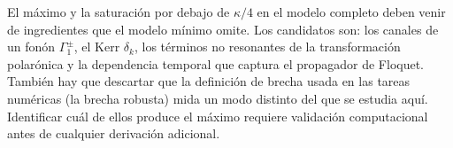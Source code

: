 \documentclass[11pt]{report}
\begin{document}
El m\'aximo y la saturaci\'on por debajo de $\kappa/4$ en el modelo completo deben venir de ingredientes que el modelo m\'inimo omite. Los candidatos son: los canales de un fon\'on $\Gamma_{1}^{\pm}$, el Kerr $\delta_{k}$, los t\'erminos no resonantes de la transformaci\'on polar\'onica y la dependencia temporal que captura el propagador de Floquet. Tambi\'en hay que descartar que la definici\'on de brecha usada en las tareas num\'ericas (la brecha robusta) mida un modo distinto del que se estudia aqu\'i. Identificar cu\'al de ellos produce el m\'aximo requiere validaci\'on computacional antes de cualquier derivaci\'on adicional.



\end{document}
